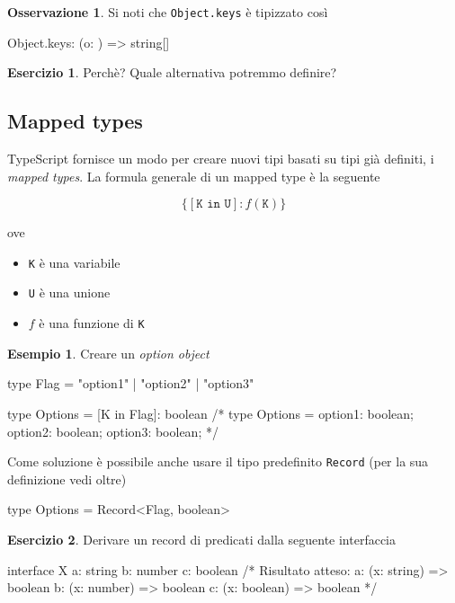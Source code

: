 \documentclass[12pt]{article}
\theoremstyle{definition}
\newtheorem{example}{Esempio}[subsection]
\newtheorem{exercise}{Esercizio}[subsection]
\newtheorem{observation}{Osservazione}[subsection]
\newenvironment{code}
  {\vspace{0.5cm} \VerbatimEnvironment\begin{typescriptcode}}
  {\end{typescriptcode} \vspace{0.2cm}}
\begin{document}
\begin{observation}
Si noti che \texttt{Object.keys} è tipizzato così

\begin{code}
Object.keys: (o: {}) => string[]
\end{code}
\end{observation}

\begin{exercise}
Perchè? Quale alternativa potremmo definire?
\end{exercise}

\subsection{Mapped types}

TypeScript fornisce un modo per creare nuovi tipi basati su tipi già definiti, i \emph{mapped types}.
La formula generale di un mapped type è la seguente

$$
\{ [\texttt{K in U}]: f(\texttt{K}) \}
$$

ove

\begin{itemize}
  \item \texttt{K} è una variabile
  \item \texttt{U} è una unione
  \item $f$ è una funzione di \texttt{K}
\end{itemize}

\begin{example}
Creare un \emph{option object}

\begin{code}
type Flag = "option1" | "option2" | "option3"

type Options = { [K in Flag]: boolean }
/*
type Options = {
    option1: boolean;
    option2: boolean;
    option3: boolean;
}
*/
\end{code}
\end{example}

Come soluzione è possibile anche usare il tipo predefinito \texttt{Record} (per la sua definizione vedi oltre)

\begin{code}
type Options = Record<Flag, boolean>
\end{code}

\begin{exercise}
Derivare un record di predicati dalla seguente interfaccia

\begin{code}
interface X {
  a: string
  b: number
  c: boolean
}
/*
Risultato atteso:
{
  a: (x: string) => boolean
  b: (x: number) => boolean
  c: (x: boolean) => boolean
}
*/
\end{code}
\end{exercise}
\end{document}
